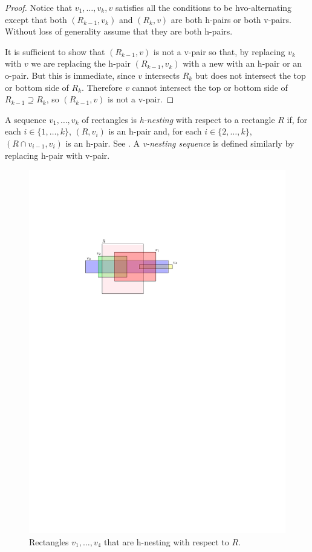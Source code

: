 \documentclass[lotsofwhite]{patmorin}
\begin{document}
\begin{proof}
  Notice that $v_1,\ldots,v_k,v$ satisfies all the conditions to be
  hvo-alternating except that both $(R_{k-1},v_k)$ and $(R_k,v)$
  are both h-pairs or both v-pairs.  Without loss of generality assume
  that they are both h-pairs.

  It is sufficient to show that $(R_{k-1},v)$ is not a v-pair so that,
  by replacing $v_k$ with $v$ we are replacing the h-pair $(R_{k-1},v_k)$
  with a new with an h-pair or an o-pair.  But this is immediate, since
  $v$ intersects $R_k$ but does not intersect the top or bottom side
  of $R_k$.  Therefore $v$ cannot intersect the top or bottom side of
  $R_{k-1}\supseteq R_k$, so $(R_{k-1},v)$ is not a v-pair.
\end{proof}

A sequence $v_1,\ldots,v_k$ of rectangles is \emph{h-nesting} with
respect to a rectangle $R$ if, for each $i\in\{1,\ldots,k\}$, $(R,v_i)$
is an h-pair and, for each $i\in\{2,\ldots,k\}$, $(R\cap v_{i-1},v_i)$
is an h-pair.  See .  A \emph{v-nesting sequence} is
defined similarly by replacing h-pair with v-pair.

\begin{figure}
 \begin{center}
    \includegraphics{figs/nesting}
 \end{center}
 \caption{Rectangles $v_1,\ldots,v_4$ that are h-nesting with respect to $R$.}
\end{figure}
\end{document}
